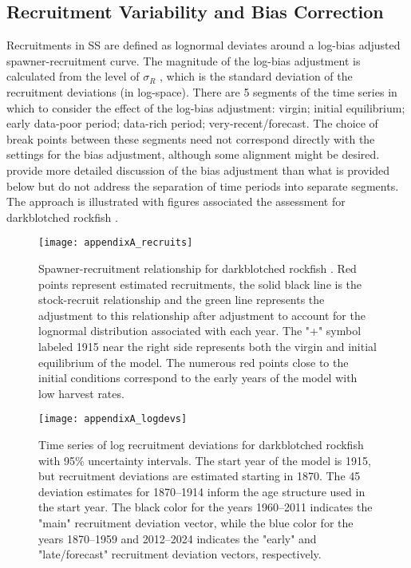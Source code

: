 \subsection{Recruitment Variability and Bias Correction }
\hypertarget{BiasCorrect}{}

Recruitments in SS are defined as lognormal deviates around a log-bias adjusted spawner-recruitment curve.  The magnitude of the log-bias adjustment is calculated from the level of $\sigma_R$ , which is the standard deviation of the recruitment deviations (in log-space).  There are 5 segments of the time series in which to consider the effect of the log-bias adjustment: virgin; initial equilibrium; early data-poor period; data-rich period; very-recent/forecast. The choice of break points between these segments need not correspond directly with the settings for the bias adjustment, although some alignment might be desired. \citet{methot_adjusting_2011} provide more detailed discussion of the bias adjustment than what is provided below but do not address the separation of time periods into separate segments. The approach is illustrated with figures associated the assessment for darkblotched rockfish \citep{gertseva_status_2013}.

\begin{figure}[H]
	\begin{center}
		\texttt{[image: appendixA\_recruits]}\\
	\end{center}	

	\caption{ Spawner-recruitment relationship for darkblotched rockfish \citep{gertseva_status_2013}. Red points represent estimated recruitments, the solid black line is the stock-recruit relationship and the green line represents the adjustment to this relationship after adjustment to account for the lognormal distribution associated with each year. The "+" symbol labeled 1915 near the right side represents both the virgin and initial equilibrium of the model. The numerous red points close to the initial conditions correspond to the early years of the model with low harvest rates.}
	\label{fig:recruits}	
\end{figure}

\begin{figure}[H]
	\begin{center}
		\texttt{[image: appendixA\_logdevs]}\\
	\end{center}
\caption{ Time series of log recruitment deviations for darkblotched rockfish with 95\% uncertainty intervals. The start year of the model is 1915, but recruitment deviations are estimated starting in 1870. The 45 deviation estimates for 1870–1914 inform the age structure used in the start year. The black color for the years 1960–2011 indicates the "main" recruitment deviation vector, while the blue color for the years 1870–1959 and 2012–2024 indicates the "early" and "late/forecast" recruitment deviation vectors, respectively.}
\label{fig:recdevs}
\end{figure}

